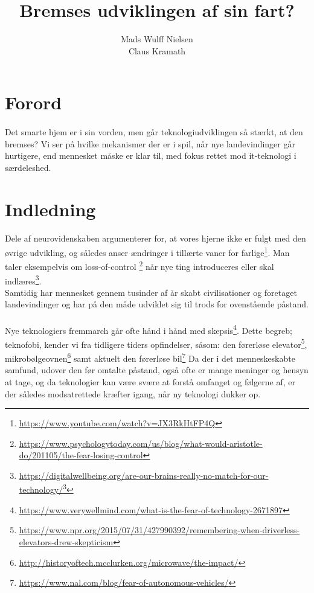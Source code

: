 \documentclass{article}
\title{%
Bremses udviklingen af sin fart?
}
\author{Mads Wulff Nielsen \\
Claus Kramath}
\begin{document}
\maketitle
\thispagestyle{empty}
\newpage
\tableofcontents
\thispagestyle{empty} 
\newpage
\section{Forord}
\paragraph{}
Det smarte hjem er i sin vorden, men går teknologiudviklingen så
stærkt, at den bremses? Vi ser på hvilke mekanismer der er i spil, når nye
landevindinger går hurtigere, end mennesket måske er klar til, med fokus
rettet mod it-teknologi i særdeleshed.
\section{Indledning}
\paragraph{}
Dele af neurovidenskaben argumenterer for, at vores hjerne ikke er fulgt med den øvrige udvikling,
og således anser ændringer i tillærte vaner for farlige\footnote{\url{https://www.youtube.com/watch?v=JX3RkHtFP4Q}}. Man taler eksempelvis om loss-of-control 
\footnote{\url{https://www.psychologytoday.com/us/blog/what-would-aristotle-do/201105/the-fear-losing-control}} når nye ting introduceres eller skal indlæres\footnote{\url{https://digitalwellbeing.org/are-our-brains-really-no-match-for-our-technology/}\footnote{https://www.youtube.com/watch?v=JX3RkHtFP4Q}}. \\
Samtidig har mennesket gennem tusinder af år skabt civilisationer og foretaget landevindinger og har på den måde udviklet sig til trods for ovenstående påstand.
\paragraph{}
Nye teknologiers fremmarch går ofte hånd i hånd med skepsis\footnote{\url{https://www.verywellmind.com/what-is-the-fear-of-technology-2671897}}.
Dette begreb; teknofobi, kender vi fra tidligere tiders opfindelser, såsom: den førerløse elevator\footnote{\url{https://www.npr.org/2015/07/31/427990392/remembering-when-driverless-elevators-drew-skepticism}}, mikrobølgeovnen\footnote{\url{http://historyoftech.mcclurken.org/microwave/the-impact/}}
samt aktuelt den førerløse bil\footnote{\url{https://www.nal.com/blog/fear-of-autonomous-vehicles/}}
Da der i det menneskeskabte samfund, udover den før omtalte påstand, også ofte er mange meninger og hensyn at tage, og da teknologier kan være svære at forstå omfanget og følgerne af, er der således modsatrettede kræfter igang, når ny teknologi dukker op.
\end{document}
